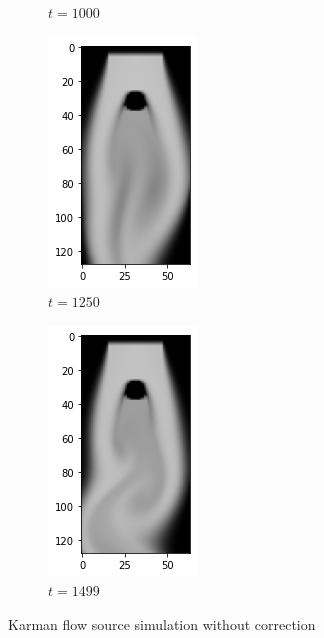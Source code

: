 \documentclass[a4paper,12pt,twoside]{report}
\begin{document}
\begin{figure}
\begin{subfigure}{0.18\textwidth}
		\caption{$t=1000$}
	\end{subfigure}
	\begin{subfigure}{0.18\textwidth}
		\centering
		\includegraphics[scale=0.5]{karmanflow/source_density_001250.png}
		\caption{$t=1250$}
	\end{subfigure}
	\begin{subfigure}{0.18\textwidth}
		\centering
		\includegraphics[scale=0.5]{karmanflow/source_density_001499.png}
		\caption{$t=1499$}
	\end{subfigure}
	\caption{Karman flow source simulation without correction}
\end{figure}
\end{document}
